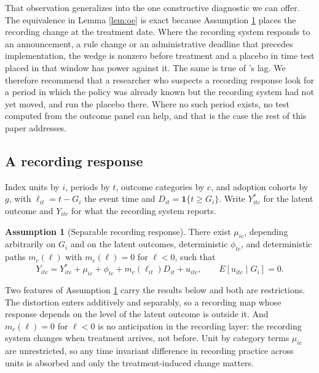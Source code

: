 \documentclass[12pt]{article}
\theoremstyle{definition}
\newtheorem{assumption}{Assumption}
\numberwithin{equation}{section}
\begin{document}
That observation generalizes into the one constructive diagnostic we can offer.
The equivalence in Lemma \ref{lem:oe} is exact because Assumption \ref{as:rec}
places the recording change at the treatment date. Where the recording system responds to
an announcement, a rule change or an administrative deadline that precedes
implementation, the wedge is nonzero before treatment and a placebo in time test
placed in that window has power against it. The same is true of
\citet{geruso2020upcoding}'s lag. We therefore recommend that a researcher who suspects a recording response look
for a period in which the policy was already known but the recording system had
not yet moved, and run the placebo there. Where no such period exists, no test
computed from the outcome panel can help, and that is the case the rest of this
paper addresses.

\subsection{A recording response}
\label{sec:recording}

Index units by $i$, periods by $t$, outcome categories by $c$, and adoption
cohorts by $g$, with $\ell_{it} = t - G_i$ the event time and $D_{it} =
\mathbf 1\{t \ge G_i\}$. Write $Y^{*}_{itc}$ for the latent outcome and
$Y_{itc}$ for what the recording system reports.

\begin{assumption}[Separable recording response]
\label{as:rec}
There exist $\mu_{ic}$, depending arbitrarily on $G_i$ and on the latent
outcomes, deterministic $\phi_{tc}$, and deterministic paths $m_c(\ell)$ with
$m_c(\ell) = 0$ for $\ell < 0$, such that
\begin{equation}
\label{eq:recmap}
Y_{itc} = Y^{*}_{itc} + \mu_{ic} + \phi_{tc} + m_c(\ell_{it})D_{it} + u_{itc},
\qquad E[u_{itc} \mid G_i] = 0 .
\end{equation}
\end{assumption}

Two features of Assumption \ref{as:rec} carry the results below and both are
restrictions. The distortion enters additively and separably, so a recording
map whose response depends on the level of the latent outcome is outside it.
And $m_c(\ell) = 0$ for $\ell < 0$ is no anticipation in the recording layer:
the recording system changes when treatment arrives, not before. Unit by category
terms $\mu_{ic}$ are unrestricted, so any time invariant difference in recording
practice across units is absorbed and only the treatment-induced change matters.
\end{document}
